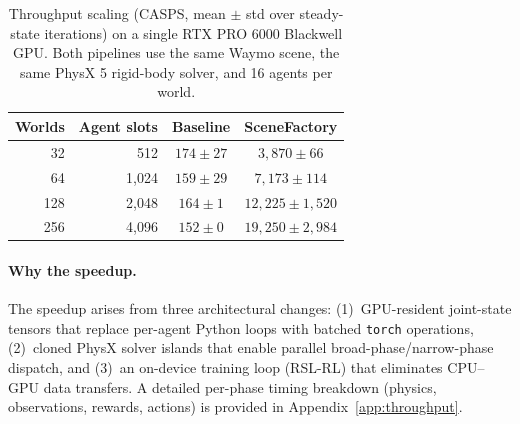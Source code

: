\begin{table}[t]
\centering
\caption{Throughput scaling (CASPS, mean $\pm$ std over steady-state iterations) on a single RTX PRO 6000 Blackwell GPU.
Both pipelines use the same Waymo scene, the same PhysX 5 rigid-body solver, and 16 agents per world.}
\label{tab:throughput_scaling}
\small
\begin{tabular}{rrcc}
\toprule
Worlds & Agent slots & Baseline & SceneFactory \\
\midrule
 32 &   512 & $174 \pm 27$ & $3{,}870 \pm 66$ \\
 64 & 1{,}024 & $159 \pm 29$ & $7{,}173 \pm 114$ \\
128 & 2{,}048 & $164 \pm 1$ & $12{,}225 \pm 1{,}520$ \\
256 & 4{,}096 & $152 \pm 0$ & $19{,}250 \pm 2{,}984$ \\
\bottomrule
\end{tabular}
\end{table}

\paragraph{Why the speedup.}
The speedup arises from three architectural changes: (1)~GPU-resident joint-state tensors that replace per-agent Python loops with batched \texttt{torch} operations, (2)~cloned PhysX solver islands that enable parallel broad-phase/narrow-phase dispatch, and (3)~an on-device training loop (RSL-RL) that eliminates CPU--GPU data transfers.
A detailed per-phase timing breakdown (physics, observations, rewards, actions) is provided in Appendix~\ref{app:throughput}.

